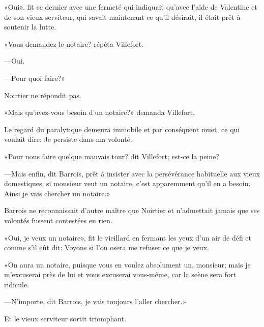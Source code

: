 «Oui», fit ce dernier avec une fermeté qui indiquait qu'avec l'aide de Valentine et de son vieux serviteur, qui savait maintenant ce qu'il désirait, il était prêt à soutenir la lutte. 

«Vous demandez le notaire? répéta Villefort. 

—Oui. 

—Pour quoi faire?» 

Noirtier ne répondit pas. 

«Mais qu'avez-vous besoin d'un notaire?» demanda Villefort. 

Le regard du paralytique demeura immobile et par conséquent muet, ce qui voulait dire: Je persiste dans ma volonté. 

«Pour nous faire quelque mauvais tour? dit Villefort; est-ce la peine? 

—Mais enfin, dit Barrois, prêt à insister avec la persévérance habituelle aux vieux domestiques, si monsieur veut un notaire, c'est apparemment qu'il en a besoin. Ainsi je vais chercher un notaire.» 

Barrois ne reconnaissait d'autre maître que Noirtier et n'admettait jamais que ses volontés fussent contestées en rien. 

«Oui, je veux un notaire», fit le vieillard en fermant les yeux d'un air de défi et comme s'il eût dit: Voyons si l'on osera me refuser ce que je veux. 

«On aura un notaire, puisque vous en voulez absolument un, monsieur; mais je m'excuserai près de lui et vous excuserai vous-même, car la scène sera fort ridicule. 

—N'importe, dit Barrois, je vais toujours l'aller chercher.» 

Et le vieux serviteur sortit triomphant. 